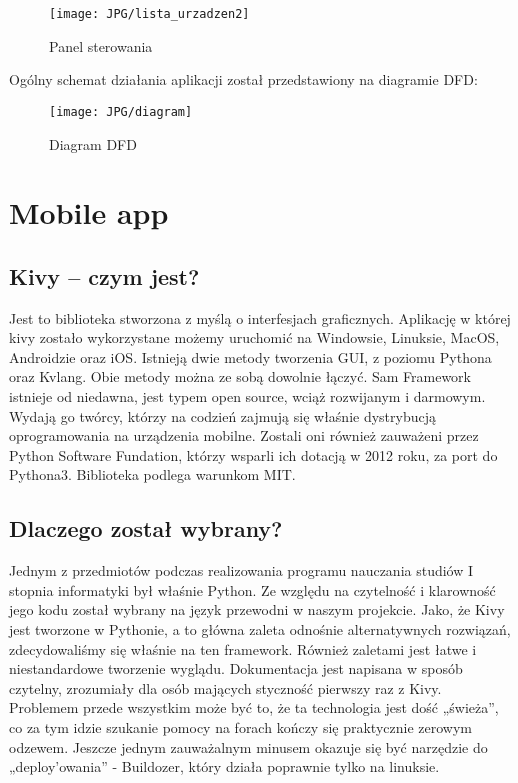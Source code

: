 \documentclass{xmgr}
\begin{document}
\hspace{2cm}
\begin{figure}[h]
\begin{center}
\texttt{[image: JPG/lista\_urzadzen2]}
\caption{Panel sterowania}
\end{center}
\end{figure}

\newpage Ogólny schemat działania aplikacji został przedstawiony na diagramie DFD:

\hspace{2cm}
\begin{figure}[h]
\begin{center}
\texttt{[image: JPG/diagram]}
\caption{Diagram DFD}
\label{Diagram}
\end{center}
\end{figure}

\chapter{Mobile app}


\section{Kivy -- czym jest?}
Jest to biblioteka stworzona z myślą o interfesjach graficznych. Aplikację w której kivy zostało wykorzystane możemy uruchomić na 
Windowsie, Linuksie, MacOS, Androidzie oraz iOS. Istnieją dwie metody tworzenia GUI, z poziomu Pythona oraz Kvlang. Obie metody można ze sobą dowolnie łączyć. Sam Framework istnieje od niedawna, jest typem open source, wciąż rozwijanym i darmowym. Wydają go twórcy, którzy na codzień zajmują się właśnie dystrybucją oprogramowania na urządzenia mobilne. Zostali oni również zauważeni przez Python Software Fundation, którzy wsparli ich dotacją w 2012 roku, za port do Pythona3. Biblioteka podlega warunkom MIT.

\section{Dlaczego został wybrany?}
Jednym z przedmiotów podczas realizowania programu nauczania studiów I stopnia informatyki był właśnie Python. Ze względu na czytelność i klarowność jego kodu został wybrany na język przewodni w naszym projekcie. Jako, że Kivy jest tworzone w Pythonie, a to główna zaleta odnośnie alternatywnych rozwiązań, zdecydowaliśmy się właśnie na ten framework. Również zaletami jest łatwe i niestandardowe tworzenie wyglądu. Dokumentacja jest napisana w sposób czytelny, zrozumiały dla osób mających styczność pierwszy raz z Kivy. Problemem przede wszystkim może być to, że ta technologia jest dość „świeża”, co za tym idzie szukanie pomocy na forach kończy się praktycznie zerowym odzewem. Jeszcze jednym zauważalnym minusem okazuje się być narzędzie do „deploy'owania” - Buildozer, który działa poprawnie tylko na linuksie.
\end{document}
